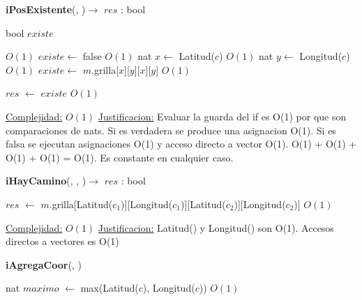 \begin{Algoritmos}

\begin{algorithm}[H]
{\textbf{iPosExistente}(, )$\to$ $res$ : bool}
\begin{algorithmic}[1]
   
\State bool $existe$

 \Comment $O(1)$
	\State $existe \gets$ false \Comment $O(1)$
\Else
	\State nat $x \gets$ Latitud($c$) \Comment $O(1)$
	\State nat $y \gets$ Longitud($c$) \Comment $O(1)$
	\State $existe \gets$ $m$.grilla[$x$][$y$][$x$][$y$] \Comment $O(1)$
\EndIf

\State $res$ $\gets$ $existe$ \Comment $O(1)$

\medskip
\Statex \underline{Complejidad:} $O(1)$
\Statex \underline{Justificacion:} Evaluar la guarda del if es O(1) por que son comparaciones de nats. Si es verdadera se produce una asignacion O(1). Si es falsa se ejecutan asignaciones O(1) y acceso directo a vector O(1). O(1) + O(1) + O(1) + O(1) = O(1). Es constante en cualquier caso.

\end{algorithmic}
\end{algorithm}


\begin{algorithm}[H]
{\textbf{iHayCamino}(, , )$\to$ $res$ : bool}
\begin{algorithmic}[1]

\State $res$ $\gets$ $m$.grilla[Latitud($c_1$)][Longitud($c_1$)][Latitud($c_2$)][Longitud($c_2$)] \Comment $O(1)$

\medskip
\Statex \underline{Complejidad:} $O(1)$
\Statex \underline{Justificacion:} Latitud() y Longitud() son O(1). Accesos directos a vectores es O(1)

\end{algorithmic}
\end{algorithm}


{\textbf{iAgregaCoor}(, )}
\begin{algorithmic}[1]

\State nat $maximo$ $\gets$ max(Latitud($c$), Longitud($c$))  \Comment $O(1)$


\end{algorithmic}
\end{Algoritmos}
